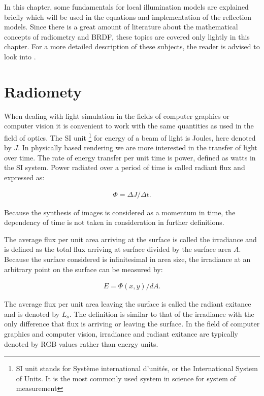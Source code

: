 \hypertarget{Fundamentals}{
}

In this chapter, some fundamentals for local illumination models are explained briefly which will be used in the equations and implementation of the reflection models. Since there is a great amount of literature about the mathematical concepts of radiometry and BRDF, these topics are covered only lightly in this chapter. For a more detailed description of these subjects, the reader is advised to look into \cite{RTR} \cite{GlobalIllumination} \cite{DigitalModeling}.

\section{Radiomety}\label{sec:Radiometry}

When dealing with light simulation in the fields of computer graphics or computer vision it is convenient to work with the same quantities as used in the field of optics. The SI unit \footnote[1]{SI unit stands for Système international d'unités, or the International System of Units. It is the most commonly used system in science for system of measurement} for energy of a beam of light is Joules, here denoted by $J$. In physically based rendering we are more interested in the transfer of light over time. The rate of energy transfer per unit time is power, defined as watts in the SI system. Power radiated over a period of time is called radiant flux and expressed as: 

		\begin{eqnarray*}
			\Phi = \Delta J / \Delta t. 
		\end{eqnarray*}

Because the synthesis of images is considered as a momentum in time, the dependency of time is not taken in consideration in further definitions.

The average flux per unit area arriving at the surface is called the irradiance and is defined as the total flux arriving at surface divided by the surface area $A$. Because the surface considered is infinitesimal in area size, the irradiance at an arbitrary point on the surface can be measured by:

		\begin{eqnarray*}
			E = \Phi(x,y) / dA. 
		\end{eqnarray*}

The average flux per unit area leaving the surface is called the radiant exitance and is denoted by $L_o$. The definition is similar to that of the irradiance with the only difference that flux is arriving or leaving the surface. In the field of computer graphics and computer vision, irradiance and radiant exitance are typically denoted by RGB values rather than energy units.

